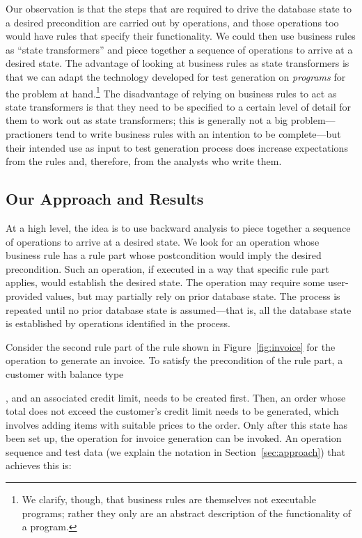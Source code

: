 Our observation is that the steps that are required to drive the database state
to a desired precondition are carried out by operations, and those operations
too would have rules that specify their functionality.  We could then use
business rules as ``state transformers'' and piece together a sequence of
operations to arrive at a desired state.  The advantage of looking at business
rules as state transformers is that we can adapt the technology developed for
test generation on \textit{programs} for the problem at hand.\footnote{We
  clarify, though, that business rules are themselves not executable programs;
  rather they only are an abstract description of the functionality of a
  program.}  The disadvantage of relying on business rules to act as state
transformers is that they need to be specified to a certain level of detail for
them to work out as state transformers; this is generally not a big
problem---practioners tend to write business rules with an intention to be
complete---but their intended use as input to test generation process does
increase expectations from the rules and, therefore, from the analysts who write
them.

\subsection{Our Approach and Results}

At a high level, the idea is to use backward analysis to piece together a
sequence of operations to arrive at a desired state.  We look for an operation
whose business rule has a rule part whose postcondition would imply the desired
precondition.  Such an operation, if executed in a way that specific rule
part applies, would establish the desired state.  The operation may require some
user-provided values, but may partially rely on prior database state. The
process is repeated until no prior database state is assumed---that is, all the
database state is established by operations identified in the process.

Consider the second rule part of the rule shown in Figure~\ref{fig:invoice} for
the operation to generate an invoice. To satisfy the precondition of the rule
part, a customer with balance type \subject{Credit}, and an associated credit
limit, needs to be created first. Then, an order whose total does not exceed the
customer's credit limit needs to be generated, which involves adding items with
suitable prices to the order. Only after this state has been set up, the
operation for invoice generation can be invoked. An operation sequence and test
data (we explain the notation in Section~\ref{sec:approach}) that achieves this
is:

